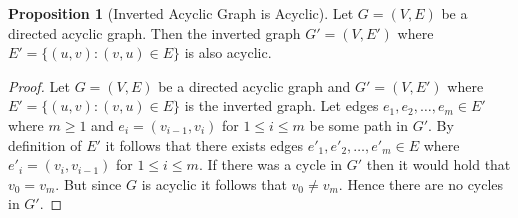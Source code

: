 \documentclass[a4paper,12pt]{article}
\theoremstyle{definition}
\newtheorem{proposition}{Proposition}[section]
\begin{document}
\begin{proposition}[Inverted Acyclic Graph is Acyclic]\label{prop:inverted-acyclic-graph}
    Let $G = (V, E)$ be a directed acyclic graph. Then the inverted graph $G' =
    (V, E')$ where $E' = \{(u, v) : (v, u) \in E\}$ is also acyclic.
\end{proposition}
\begin{proof}
    Let $G = (V, E)$ be a directed acyclic graph and $G' = (V, E')$ where $E' =
    \{(u, v) : (v, u) \in E\}$ is the inverted graph. Let edges $e_1, e_2,
    \ldots, e_m \in E'$ where $m \geq 1$ and $e_i = (v_{i-1}, v_i)$ for $1 \leq
    i \leq m$ be some path in $G'$. By definition of $E'$ it follows that there
    exists edges $e'_1, e'_2, \ldots, e'_m \in E$ where $e'_i = (v_i, v_{i-1})$
    for $1 \leq i \leq m$. If there was a cycle in $G'$ then it would hold that
    $v_0 = v_m$. But since $G$ is acyclic it follows that $v_0 \neq v_m$. Hence
    there are no cycles in $G'$.  
\end{proof}
\end{document}
